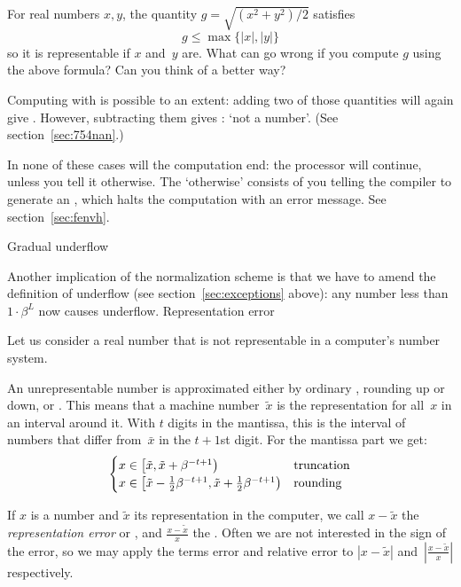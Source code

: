 \begin{exercise}
For real numbers $x,y$, the quantity $g=\sqrt{(x^2+y^2)/2}$ satisfies
\begin{equation}
  g\leq \max\{|x|,|y|\}
\end{equation}
so it is representable if $x$ and~$y$ are.
What can go wrong if you compute $g$ using the above formula?
Can you think of a better way?
\end{exercise}


Computing with  is possible to an extent: adding two of those
quantities will again give . However, subtracting them gives
: `not a number'.
(See section~\ref{sec:754nan}.)

In none of these cases will the computation end:
the processor will continue, unless you tell it otherwise.
The `otherwise' consists of you telling the compiler to generate an ,
which halts the computation with an error message. See section~\ref{sec:fenvh}.

 {Gradual underflow}
\label{sec:754underflow}

Another implication of the normalization scheme is that we have to amend the
definition of underflow (see section~\ref{sec:exceptions} above):
any number less than $1\cdot\beta^L$ now causes underflow.
%
 {Representation error}

Let us consider a real number that is not representable in a
computer's number system.

An unrepresentable number is approximated either by
ordinary , rounding up or down, or .
This means that a machine number~$\tilde x$ is the representation for
all~$x$ in an interval around it.  With $t$ digits in the
mantissa, this is the interval of numbers that differ
from~$\bar x$ in the $t+1$st digit. For the mantissa
part we get:
\begin{equation}
\begin{cases}
  x\in \left[\tilde x,\tilde x+\beta^{-t+1}\right)&\hbox{truncation}\\
  x\in \left[\tilde x-\frac12 \beta^{-t+1},\tilde x+\frac12 \beta^{-t+1}\right)
    &\hbox{rounding}
\end{cases}
\end{equation}

If $x$ is a number and $\tilde x$ its representation in the computer,
we call $x-\tilde x$ the \emph{representation error} or
, and $\frac{x-\tilde x}{x}$
the . Often we are not
interested in the sign of the error, so we may apply the terms error
and relative error to $|x-\tilde x|$ and~$|\frac{x-\tilde x}{x}|$
respectively.

